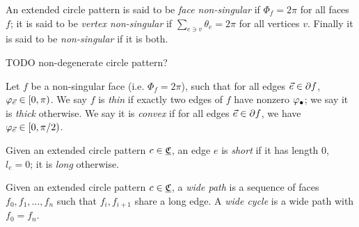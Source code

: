 \begin{definition}
An extended circle pattern is said to be \emph{face non-singular}
if $\Phi_f = 2\pi$ for all faces $f$; it is said to be \emph{vertex non-singular}
if $\sum_{e \ni v} \theta_e = 2\pi$ for all vertices $v$.
Finally it is said to be \emph{non-singular} if it is both.
\end{definition}

TODO non-degenerate circle pattern?

\begin{definition}
Let $f$ be a non-singular face (i.e. $\Phi_f = 2\pi$),
such that for all edges $\vec{e} \in \partial f$,
$\varphi_{\vec{e}} \in [0,\pi)$.
We say $f$ is \emph{thin} if
exactly two edges of $f$ have nonzero $\varphi_\bullet$;
we say it is \emph{thick} otherwise.
We say it is \emph{convex} if for all edges $\vec{e} \in \partial f$,
we have $\varphi_{\vec{e}} \in [0,\pi/2)$.
\end{definition}




\begin{definition}
Given an extended circle pattern $c\in {\underline{\mathfrak{C}}}$, an edge $e$ is \emph{short}
if it has length 0, $l_e = 0$;
it is \emph{long} otherwise.
\end{definition}


\begin{definition}
Given an extended circle pattern $c\in {\underline{\mathfrak{C}}}$, a \emph{wide path}
is a sequence of faces $f_0,f_1,\ldots,f_n$
such that $f_i,f_{i+1}$ share a long edge.
A \emph{wide cycle} is a wide path with $f_0 = f_n$.
\end{definition}


